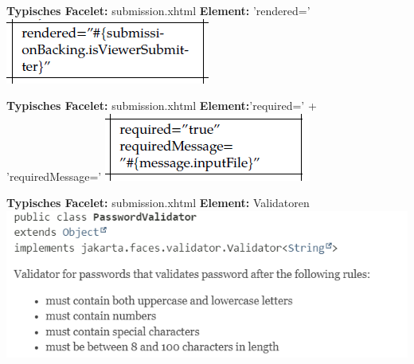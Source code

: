 \documentclass{beamer}
\begin{document}
    \begin{frame}{\textbf{Typisches Facelet:} submission.xhtml}
        \textbf{Element:} 'rendered='
        \newline\newline
        \centering
        \includegraphics[height=0.3\textheight]{graphics/facelet/fac_rendered}
    \end{frame}
    \begin{frame}{\textbf{Typisches Facelet:} submission.xhtml}
        \textbf{Element:}'required=' + 'requiredMessage='
        \newline\newline
        \centering
        \includegraphics[height=0.3\textheight]{graphics/facelet/fac_required}
    \end{frame}
    \begin{frame}{\textbf{Typisches Facelet:} submission.xhtml}
        \textbf{Element:} Validatoren
        \newline\newline
        \centering
        \includegraphics[height=0.4\textheight]{graphics/facelet/doc_validator}
    \end{frame}
\end{document}
